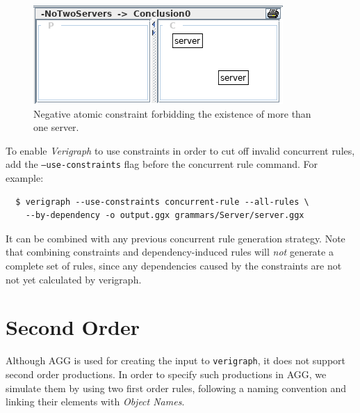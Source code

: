 \documentclass[12pt]{article}
\begin{document}
\begin{figure}
  \noindent
  \centering
  \includegraphics[scale = 0.6]{img/concurrent-rules/new_atomic02}
  \caption{Negative atomic constraint forbidding the existence of more than one server.}
\end{figure}


To enable \emph{Verigraph} to use constraints in order to cut off invalid concurrent rules, add the \texttt{--use-constraints} flag before the concurrent rule command. For example:

\begin{verbatim}
  $ verigraph --use-constraints concurrent-rule --all-rules \ 
    --by-dependency -o output.ggx grammars/Server/server.ggx
\end{verbatim}

It can be combined with any previous concurrent rule generation strategy.
Note that combining constraints and dependency-induced rules will \emph{not} generate a complete set of rules, since any dependencies caused by the constraints are not not yet calculated by verigraph.

\pagebreak

\section{Second Order}

Although AGG is used for creating the input to \texttt{verigraph}, it does not support second order productions. In order to specify such productions in AGG, we simulate them by using two first order rules, following a naming convention and linking their elements with \emph{Object Names}.\\
\end{document}
